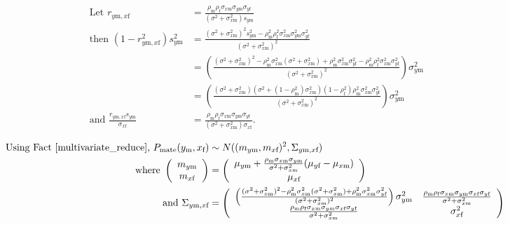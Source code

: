 \documentclass{article}
\newcommand{\x}[1]{\text{#1}}
\begin{document}
\begin{pf}
\begin{enumerate}
\begin{align*}
\\ \text{ Let } r_{y\x{m},x\x{f}}&=\frac{\rho_\x{m}\rho_\x{f}\sigma_{x\x{m}}\sigma_{y\x{m}}\sigma_{y\x{f}}}{(\sigma^2+\sigma_{x\x{m}}^2)s_{y\x{m}}}
\\ \text{ then } (1-r_{y\x{m},x\x{f}}^2)s_{y\x{m}}^2&=\frac{(\sigma^2+\sigma_{x\x{m}}^2)^2s_{y\x{m}}^2-\rho_\x{m}^2\rho_\x{f}^2\sigma_{x\x{m}}^2\sigma_{y\x{m}}^2\sigma_{y\x{f}}^2}{(\sigma^2+\sigma_{x\x{m}}^2)^2}
\\&=\left(\frac{(\sigma^2+\sigma_{x\x{m}}^2)^2-\rho_\x{m}^2\sigma_{x\x{m}}^2(\sigma^2+\sigma_{x\x{m}}^2)+\rho_\x{m}^2\sigma_{x\x{m}}^2\sigma_{y\x{f}}^2-\rho_\x{m}^2\rho_\x{f}^2\sigma_{x\x{m}}^2\sigma_{y\x{f}}^2}{(\sigma^2+\sigma_{x\x{m}}^2)^2}\right)\sigma_{y\x{m}}^2
\\&=\left(\frac{(\sigma^2+\sigma_{x\x{m}}^2)(\sigma^2+(1-\rho_\x{m}^2)\sigma_{x\x{m}}^2)(1-\rho_\x{f}^2)\rho_\x{m}^2\sigma_{x\x{m}}^2\sigma_{y\x{f}}^2}{(\sigma^2+\sigma_{x\x{m}}^2)^2}\right)\sigma_{y\x{m}}^2
\\ \text { and } \frac{r_{y\x{m},x\x{f}}s_{y\x{m}}}{\sigma_{x\x{f}}}&=\frac{\rho_\x{m}\rho_\x{f}\sigma_{x\x{m}}\sigma_{y\x{m}}\sigma_{y\x{f}}}{(\sigma^2+\sigma_{x\x{m}}^2)\sigma_{x\x{f}}}.
\end{align*}

\begin{align*}
\text{Using Fact \ref{multivariate_reduce}, } P_\text{mate}(y_\x{m},x_\x{f})&\sim N((m_{y\x{m}},m_{x\x{f}})^2,\Sigma_{y\x{m},x\x{f}}) 
\\ \text{ where } \left(\begin{array}{c}m_{y\x{m}} \\  m_{x\x{f}} \end{array}\right)&=\left(\begin{array}{c}\mu_{y\x{m}}+\frac{\rho_\x{m}\sigma_{x\x{m}}\sigma_{y\x{m}}}{\sigma^2+\sigma_{x\x{m}}^2}(\mu_{y\x{f}}-\mu_{x\x{m}}) \\ \mu_{x\x{f}} \end{array}\right)
\\ \text{ and } \Sigma_{y\x{m},x\x{f}}&=\left(\begin{array}{cc}\left(\frac{(\sigma^2+\sigma_{x\x{m}}^2)^2-\rho_\x{m}^2\sigma_{x\x{m}}^2(\sigma^2+\sigma_{x\x{m}}^2)+\rho_\x{m}^2\sigma_{x\x{m}}^2\sigma_{y\x{f}}^2}{(\sigma^2+\sigma_{x\x{m}}^2)^2}\right)\sigma_{y\x{m}}^2 & \frac{\rho_\x{m}\rho_\x{f}\sigma_{x\x{m}}\sigma_{y\x{m}}\sigma_{x\x{f}}\sigma_{y\x{f}}}{\sigma^2+\sigma_{x\x{m}}^2} \\ \frac{\rho_\x{m}\rho_\x{f}\sigma_{x\x{m}}\sigma_{y\x{m}}\sigma_{x\x{f}}\sigma_{y\x{f}}}{\sigma^2+\sigma_{x\x{m}}^2}& \sigma_{x\x{f}}^2 \end{array}\right)
\end{align*}


\end{enumerate}
\end{pf}
\end{document}
